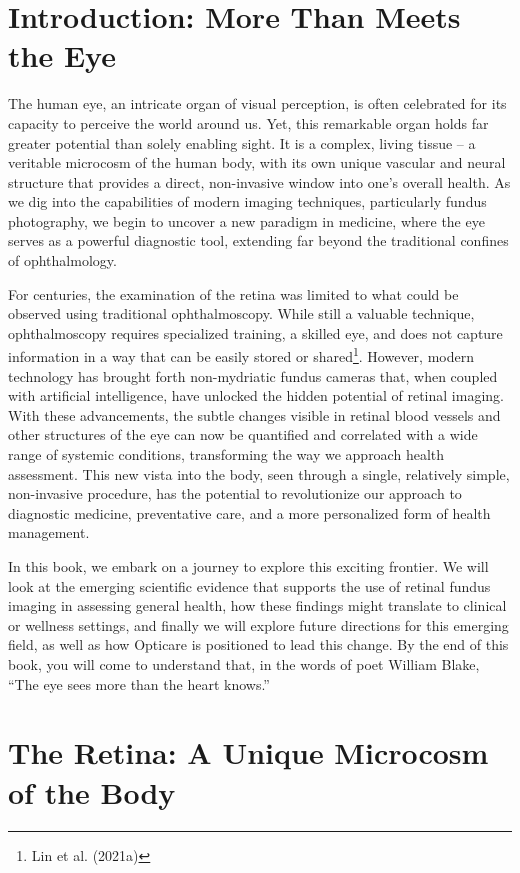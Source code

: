 \documentclass[
  Letterpaper,
]{scrbook}
\begin{document}
\section{Introduction: More Than Meets the
Eye}\label{introduction-more-than-meets-the-eye}

The human eye, an intricate organ of visual perception, is often
celebrated for its capacity to perceive the world around us. Yet, this
remarkable organ holds far greater potential than solely enabling sight.
It is a complex, living tissue -- a veritable microcosm of the human
body, with its own unique vascular and neural structure that provides a
direct, non-invasive window into one's overall health. As we dig into
the capabilities of modern imaging techniques, particularly fundus
photography, we begin to uncover a new paradigm in medicine, where the
eye serves as a powerful diagnostic tool, extending far beyond the
traditional confines of ophthalmology.

For centuries, the examination of the retina was limited to what could
be observed using traditional ophthalmoscopy. While still a valuable
technique, ophthalmoscopy requires specialized training, a skilled eye,
and does not capture information in a way that can be easily stored or
shared\footnote{Lin et al. (2021a)}. However, modern technology has
brought forth non-mydriatic fundus cameras that, when coupled with
artificial intelligence, have unlocked the hidden potential of retinal
imaging. With these advancements, the subtle changes visible in retinal
blood vessels and other structures of the eye can now be quantified and
correlated with a wide range of systemic conditions, transforming the
way we approach health assessment. This new vista into the body, seen
through a single, relatively simple, non-invasive procedure, has the
potential to revolutionize our approach to diagnostic medicine,
preventative care, and a more personalized form of health management.

In this book, we embark on a journey to explore this exciting frontier.
We will look at the emerging scientific evidence that supports the use
of retinal fundus imaging in assessing general health, how these
findings might translate to clinical or wellness settings, and finally
we will explore future directions for this emerging field, as well as
how Opticare is positioned to lead this change. By the end of this book,
you will come to understand that, in the words of poet William Blake,
``The eye sees more than the heart knows.''

\section{The Retina: A Unique Microcosm of the
Body}\label{the-retina-a-unique-microcosm-of-the-body}
\end{document}
